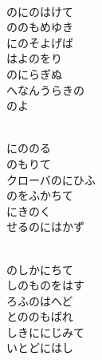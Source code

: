 \documentclass[10pt,b5j]{tarticle} %
\begin{document}
\vspace{1.5em} %
\newcommand{\linespace}{0.5em} %
\newcommand{\blocksize}{0.5\hsize} %
\newcommand{\itemmargin}{6em} %
\begin{enumerate} %
    \setlength{\itemindent}{\itemmargin} %
    \begin{minipage}[c]{\blocksize}
    
        \vspace{\linespace}
        \item~\\
        のにのはけて\\
        ののもめゆき\\
        にのそよげば\\
        はよのをり\\
        のにらぎぬ\\
        へなんうらきの\\
        のよ
        
        \vspace{\linespace}
        \item~\\
        にののる\\
        のもりて\\
        クローバのにひふ\\
        のをふかちて\\
        にきのく\\
        せるのにはかず
        
        \vspace{\linespace}
        \item~\\
        のしかにちて\\
        しのものをはす\\
        ろふのはへど\\
        とののもばれ\\
        しきににじみて\\
        いとどにはし
        

\end{minipage}
\end{enumerate}
\end{document}
